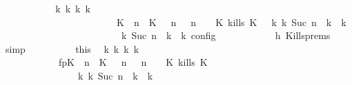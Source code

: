 \begin{isabellebody}
\ \ \ \ \ \ \ \ \isamarkupfalse%
\ \isamarkupfalse%
\ {\isacartoucheopen}{\isasymexists}{\isasymGamma}\isactrlsub k\ {\isasymPsi}\isactrlsub k\ {\isasymPhi}\isactrlsub k\ k{\isachardot}\ {\isacharparenleft}\isanewline
\ \ \ \ \ \ \ \ \ \ \ \ \ \ \ \ \ \ \ \ \ \ \ \ {\isacharparenleft}{\isacharparenleft}{\isacharparenleft}K\ {\isasymUp}\ n{\isacharparenright}\ {\isacharhash}\ {\isacharparenleft}K\ {\isasymnot}{\isasymUp}\ {\isasymge}\ n{\isacharparenright}\ {\isacharhash}\ {\isasymGamma}{\isacharparenright}{\isacharcomma}\ n\ {\isasymturnstile}\ {\isasymPsi}\ {\isasymtriangleright}\ {\isacharparenleft}{\isacharparenleft}K\ kills\ K\ {\isacharhash}\ {\isasymPhi}{\isacharparenright}{\isacharparenright}\ {\isasymhookrightarrow}\isactrlbsup k\isactrlesup \ {\isacharparenleft}{\isasymGamma}\isactrlsub k{\isacharcomma}\ Suc\ n\ {\isasymturnstile}\ {\isasymPsi}\isactrlsub k\ {\isasymtriangleright}\ {\isasymPhi}\isactrlsub k{\isacharparenright}\isanewline
\ \ \ \ \ \ \ \ \ \ \ \ \ \ \ \ \ \ \ \ {\isacharparenright}\ {\isasymand}\ {\isasymrho}\ {\isasymin}\ {\isasymlbrakk}\ {\isasymGamma}\isactrlsub k{\isacharcomma}\ Suc\ n\ {\isasymturnstile}\ {\isasymPsi}\isactrlsub k\ {\isasymtriangleright}\ {\isasymPhi}\isactrlsub k\ {\isasymrbrakk}\isactrlsub c\isactrlsub o\isactrlsub n\isactrlsub f\isactrlsub i\isactrlsub g{\isacartoucheclose}\isanewline
\ \ \ \ \ \ \ \ \ \ \isamarkupfalse%
\ h{}\ Kills{\isachardot}prems\ \isamarkupfalse%
\ simp\isanewline
\ \ \ \ \ \ \ \ \isamarkupfalse%
\ this\ \isamarkupfalse%
\ {\isasymGamma}\isactrlsub k\ {\isasymPsi}\isactrlsub k\ {\isasymPhi}\isactrlsub k\ k\ \isanewline
\ \ \ \ \ \ \ \ \ \ \ \ fp{\isacharcolon}{\isacartoucheopen}{\isacharparenleft}{\isacharparenleft}{\isacharparenleft}K\ {\isasymUp}\ n{\isacharparenright}\ {\isacharhash}\ {\isacharparenleft}K\ {\isasymnot}{\isasymUp}\ {\isasymge}\ n{\isacharparenright}\ {\isacharhash}\ {\isasymGamma}{\isacharparenright}{\isacharcomma}\ n\ {\isasymturnstile}\ {\isasymPsi}\ {\isasymtriangleright}\ {\isacharparenleft}{\isacharparenleft}K\ kills\ K\ {\isacharhash}\ {\isasymPhi}{\isacharparenright}{\isacharparenright}\isanewline
\ \ \ \ \ \ \ \ \ \ \ \ \ \ \ \ {\isasymhookrightarrow}\isactrlbsup k\isactrlesup \ {\isacharparenleft}{\isasymGamma}\isactrlsub k{\isacharcomma}\ Suc\ n\ {\isasymturnstile}\ {\isasymPsi}\isactrlsub k\ {\isasymtriangleright}\ {\isasymPhi}\isactrlsub k{\isacharparenright}{\isacartoucheclose}\isanewline

\end{isabellebody}
